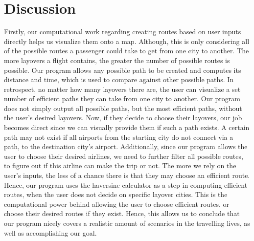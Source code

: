 \documentclass[fontsize=11pt]{article}
\begin{document}
\section*{Discussion}
Firstly, our computational work regarding creating routes based on user inputs directly helps us visualize them onto a map. Although, this is only considering all of the possible routes a passenger could take to get from one city to another. The more layovers a flight contains, the greater the number of possible routes is possible. Our program allows any possible path to be created and computes its distance and time, which is used to compare against other possible paths. In retrospect, no matter how many layovers there are, the user can visualize a set number of efficient paths they can take from one city to another. Our program does not simply output all possible paths, but the most efficient paths, without the user’s desired layovers. Now, if they decide to choose their layovers, our job becomes direct since we can visually provide them if such a path exists. A certain path may not exist if all airports from the starting city do not connect via a path, to the destination city’s airport. Additionally, since our program allows the user to choose their desired airlines, we need to further filter all possible routes, to figure out if this airline can make the trip or not. The more we rely on the user’s inputs, the less of a chance there is that they may choose an efficient route. Hence, our program uses the haversine calculator as a step in computing efficient routes, when the user does not decide on specific layover cities. This is the computational power behind allowing the user to choose efficient routes, or choose their desired routes if they exist. Hence, this allows us to conclude that our program nicely covers a realistic amount of scenarios in the travelling lives, as well as accomplishing our goal. \\
\end{document}

